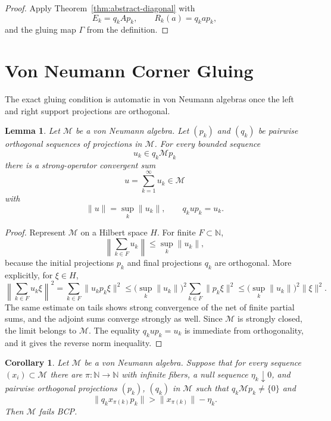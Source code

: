 \documentclass[11pt]{article}
\newtheorem{lemma}{Lemma}
\newtheorem{corollary}{Corollary}
\newcommand{\N}{\mathbb N}
\newcommand{\M}{\mathcal M}
\begin{document}
\begin{proof}
Apply Theorem~\ref{thm:abstract-diagonal} with
\[
        E_k=q_kAp_k,\qquad R_k(a)=q_kap_k,
\]
and the gluing map \(\Gamma\) from the definition.
\end{proof}

\section*{Von Neumann Corner Gluing}

The exact gluing condition is automatic in von Neumann algebras once the
left and right support projections are orthogonal.

\begin{lemma}
\label{lem:vn-gluing}
Let \(\M\) be a von Neumann algebra.  Let \((p_k)\) and \((q_k)\) be pairwise
orthogonal sequences of projections in \(\M\).  For every bounded sequence
\[
        u_k\in q_k\M p_k
\]
there is a strong-operator convergent sum
\[
        u=\sum_{k=1}^\infty u_k\in\M
\]
with
\[
        \|u\|=\sup_k\|u_k\|,
        \qquad
        q_kup_k=u_k .
\]
\end{lemma}

\begin{proof}
Represent \(\M\) on a Hilbert space \(H\).  For finite \(F\subset\N\),
\[
        \left\|\sum_{k\in F}u_k\right\|\le \sup_k\|u_k\|,
\]
because the initial projections \(p_k\) and final projections \(q_k\) are
orthogonal.  More explicitly, for \(\xi\in H\),
\[
        \left\|\sum_{k\in F}u_k\xi\right\|^2
        =
        \sum_{k\in F}\|u_kp_k\xi\|^2
        \le
        \big(\sup_k\|u_k\|\big)^2\sum_{k\in F}\|p_k\xi\|^2
        \le
        \big(\sup_k\|u_k\|\big)^2\|\xi\|^2 .
\]
The same estimate on tails shows strong convergence of the net of finite
partial sums, and the adjoint sums converge strongly as well.  Since \(\M\)
is strongly closed, the limit belongs to \(\M\).  The equality
\(q_kup_k=u_k\) is immediate from orthogonality, and it gives the reverse
norm inequality.
\end{proof}

\begin{corollary}
\label{cor:vn-corner}
Let \(\M\) be a von Neumann algebra.  Suppose that for every sequence
\((x_i)\subset\M\) there are \(\pi:\N\to\N\) with infinite fibers, a null
sequence \(\eta_k\downarrow0\), and pairwise orthogonal projections
\((p_k)\), \((q_k)\) in \(\M\) such that \(q_k\M p_k\ne\{0\}\) and
\[
        \|q_kx_{\pi(k)}p_k\|>\|x_{\pi(k)}\|-\eta_k .
\]
Then \(\M\) fails BCP.
\end{corollary}
\end{document}
